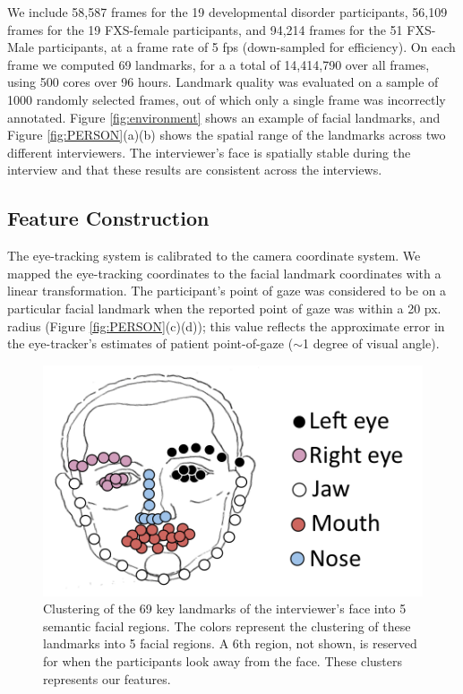 \documentclass[10pt,twocolumn,letterpaper]{article}
\begin{document}
We include 58,587 frames for the 19 developmental disorder participants, 56,109 frames for the 19 FXS-female participants, and 94,214 frames for the 51 FXS-Male participants, at a frame rate of 5 fps (down-sampled for efficiency). On each frame we computed 69 landmarks, for a a total of 14,414,790 over all frames, using 500 cores over 96 hours. Landmark quality was evaluated on a sample of 1000 randomly selected frames, out of which only a single frame was incorrectly annotated. Figure \ref{fig:environment} shows an example of facial landmarks, and Figure \ref{fig:PERSON}(a)(b) shows the spatial range of the landmarks across two different interviewers. The interviewer's face is spatially stable during the interview and that these results are consistent across the interviews. 
 
\subsection{Feature Construction}
\label{ssec:feature_construction}
The eye-tracking system is calibrated to the camera coordinate system. We mapped the eye-tracking coordinates to the facial landmark coordinates with a linear transformation. The participant's point of gaze was considered to be on a particular facial landmark when the reported point of gaze was within a 20 px. radius (Figure \ref{fig:PERSON}(c)(d)); this value reflects the approximate error in the eye-tracker's estimates of patient point-of-gaze ($\sim$1 degree of visual angle). 

\begin{figure}[h]
    \begin{center}
        \includegraphics[width=0.5\linewidth]{figures/face2.png}
    \end{center}
    \caption{Clustering of the 69 key landmarks of the interviewer's face into 5 semantic facial regions. The colors represent the clustering of these landmarks into 5 facial regions. A 6th region, not shown, is reserved for when the participants look away from the face. These clusters represents our features.}
    \label{fig:feats}
\end{figure}
\end{document}
